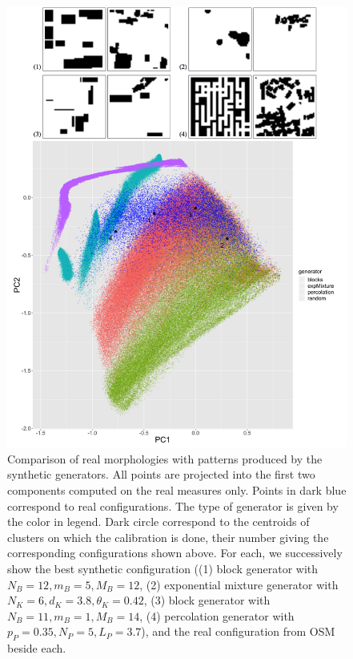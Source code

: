 \documentclass[letterpaper]{article}
\begin{document}


\begin{figure}
\vspace{-1.8cm}
    \centering
    \includegraphics[width=\linewidth]{fig4}
    \caption{Comparison of real morphologies with patterns produced by the synthetic generators. All points are projected into the first two components computed on the real measures only. Points in dark blue correspond to real configurations. The type of generator is given by the color in legend. Dark circle correspond to the centroids of clusters on which the calibration is done, their number giving the corresponding configurations shown above. For each, we successively show the best synthetic configuration ((1) block generator with $N_B=12,m_B=5,M_B=12$, (2) exponential mixture generator with $N_K=6,d_K=3.8,\theta_K=0.42$, (3) block generator with $N_B=11,m_B=1,M_B=14$, (4) percolation generator with $p_P=0.35,N_P=5,L_P=3.7$), and the real configuration from OSM beside each.}
    \label{fig:lhs}
\end{figure}
\end{document}
